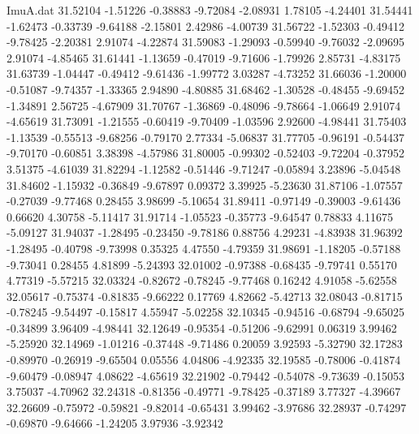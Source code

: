 \begin{filecontents}{ImuA.dat}
  31.52104   -1.51226   -0.38883   -9.72084   -2.08931    1.78105   -4.24401
  31.54441   -1.62473   -0.33739   -9.64188   -2.15801    2.42986   -4.00739
  31.56722   -1.52303   -0.49412   -9.78425   -2.20381    2.91074   -4.22874
  31.59083   -1.29093   -0.59940   -9.76032   -2.09695    2.91074   -4.85465
  31.61441   -1.13659   -0.47019   -9.71606   -1.79926    2.85731   -4.83175
  31.63739   -1.04447   -0.49412   -9.61436   -1.99772    3.03287   -4.73252
  31.66036   -1.20000   -0.51087   -9.74357   -1.33365    2.94890   -4.80885
  31.68462   -1.30528   -0.48455   -9.69452   -1.34891    2.56725   -4.67909
  31.70767   -1.36869   -0.48096   -9.78664   -1.06649    2.91074   -4.65619
  31.73091   -1.21555   -0.60419   -9.70409   -1.03596    2.92600   -4.98441
  31.75403   -1.13539   -0.55513   -9.68256   -0.79170    2.77334   -5.06837
  31.77705   -0.96191   -0.54437   -9.70170   -0.60851    3.38398   -4.57986
  31.80005   -0.99302   -0.52403   -9.72204   -0.37952    3.51375   -4.61039
  31.82294   -1.12582   -0.51446   -9.71247   -0.05894    3.23896   -5.04548
  31.84602   -1.15932   -0.36849   -9.67897    0.09372    3.39925   -5.23630
  31.87106   -1.07557   -0.27039   -9.77468    0.28455    3.98699   -5.10654
  31.89411   -0.97149   -0.39003   -9.61436    0.66620    4.30758   -5.11417
  31.91714   -1.05523   -0.35773   -9.64547    0.78833    4.11675   -5.09127
  31.94037   -1.28495   -0.23450   -9.78186    0.88756    4.29231   -4.83938
  31.96392   -1.28495   -0.40798   -9.73998    0.35325    4.47550   -4.79359
  31.98691   -1.18205   -0.57188   -9.73041    0.28455    4.81899   -5.24393
  32.01002   -0.97388   -0.68435   -9.79741    0.55170    4.77319   -5.57215
  32.03324   -0.82672   -0.78245   -9.77468    0.16242    4.91058   -5.62558
  32.05617   -0.75374   -0.81835   -9.66222    0.17769    4.82662   -5.42713
  32.08043   -0.81715   -0.78245   -9.54497   -0.15817    4.55947   -5.02258
  32.10345   -0.94516   -0.68794   -9.65025   -0.34899    3.96409   -4.98441
  32.12649   -0.95354   -0.51206   -9.62991    0.06319    3.99462   -5.25920
  32.14969   -1.01216   -0.37448   -9.71486    0.20059    3.92593   -5.32790
  32.17283   -0.89970   -0.26919   -9.65504    0.05556    4.04806   -4.92335
  32.19585   -0.78006   -0.41874   -9.60479   -0.08947    4.08622   -4.65619
  32.21902   -0.79442   -0.54078   -9.73639   -0.15053    3.75037   -4.70962
  32.24318   -0.81356   -0.49771   -9.78425   -0.37189    3.77327   -4.39667
  32.26609   -0.75972   -0.59821   -9.82014   -0.65431    3.99462   -3.97686
  32.28937   -0.74297   -0.69870   -9.64666   -1.24205    3.97936   -3.92342

\end{filecontents}
